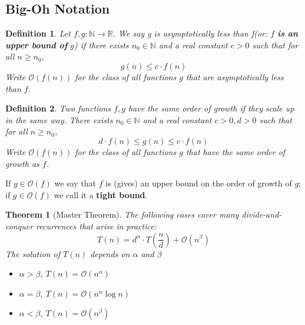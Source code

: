 \documentclass{ctexart}
\newtheorem{theorem}{\indent Theorem}[section]
\newtheorem{definition}{\indent Definition}[section]
\begin{document}
\subsection{Big-Oh Notation}
\begin{definition}
    Let $f,g:\mathbb{N} \rightarrow \mathbb{R}$. We say g is asymptotically less than f(or: $f$ \textbf{is an upper bound of } $g$) if there exists $n_0 \in \mathbb{N}$ and a real constant $c > 0$ such that for all $n \geqslant n_0$,
    \[
        g(n) \leqslant c \cdot f(n)
    \]
    Write $\mathcal{O}(f(n))$ for the class of all functions $g$ that are asymptotically less than $f$.
\end{definition}
\begin{definition}
    Two functions $f,g$ have the same order of growth if they scale up in the same way. 
    There exists $n_0 \in \mathbb{N}$ and a real constant $c > 0, d > 0$ such that for all $n \geqslant n_0$,
    \[
        d \cdot f(n) \leqslant  g(n) \leqslant c \cdot f(n)
    \]
    Write $\mathcal{O}(f(n))$ for the class of all functions $g$ that have the same order of growth as $f$.
\end{definition}
If $g \in \mathcal{O}(f)$ we say that $f$ is (gives) an upper bound on the order of growth of $g$; if $g \in \mathcal{O}(f)$ we call it a \textbf{tight bound}.

\begin{theorem}[Master Theorem]
    The following cases cover many divide-and-conquer recurrences that arise in practice:
    \[
        T(n) = d^{\alpha} \cdot T(\frac{n}{d}) + \mathcal{O}(n^{\beta})
    \]
    The solution of $T(n)$ depends on $\alpha$ and $\beta$
    \begin{itemize}
        \item $\alpha > \beta$, $T(n) = \mathcal{O}(n^{\alpha})$
        \item $\alpha = \beta$, $T(n) = \mathcal{O}(n^{\alpha}\log{n})$
        \item $\alpha < \beta$, $T(n) = \mathcal{O}(n^{\beta})$
    \end{itemize}
\end{theorem}
\end{document}
